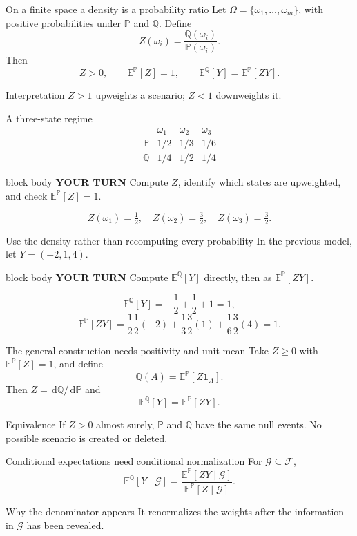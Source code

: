 \documentclass[handout,10pt,aspectratio=169]{beamer}
\newenvironment{pausebox}{\begin{beamercolorbox}[rounded=true,sep=0.8em,wd=\textwidth]{block body}
  \textbf{\color{CourseGold}YOUR TURN}\quad}{\end{beamercolorbox}}
\newcommand{\dd}{\,\mathrm d}
\newcommand{\E}{\mathbb E}
\newcommand{\Pp}{\mathbb P}
\newcommand{\Q}{\mathbb Q}
\newcommand{\cF}{\mathcal F}
\newcommand{\1}{\mathbf 1}
\begin{document}
\begin{frame}{On a finite space a density is a probability ratio}
Let \(\Omega=\{\omega_1,\ldots,\omega_m\}\), with positive probabilities
under \(\Pp\) and \(\Q\). Define
\[
Z(\omega_i)=\frac{\Q(\omega_i)}{\Pp(\omega_i)}.
\]
Then
\[
Z>0,\qquad \E^\Pp[Z]=1,\qquad
\boxed{\E^\Q[Y]=\E^\Pp[ZY].}
\]
\begin{block}{Interpretation}
\(Z>1\) upweights a scenario; \(Z<1\) downweights it.
\end{block}
\end{frame}

\begin{frame}{A three-state regime}
\[
\begin{array}{c|ccc}
 & \omega_1 & \omega_2 & \omega_3\\ \hline
\Pp & 1/2 & 1/3 & 1/6\\
\Q  & 1/4 & 1/2 & 1/4
\end{array}
\]
\begin{pausebox}
Compute \(Z\), identify which states are upweighted, and check
\(\E^\Pp[Z]=1\).
\end{pausebox}

\[
\boxed{Z(\omega_1)=\tfrac12,\quad
Z(\omega_2)=\tfrac32,\quad Z(\omega_3)=\tfrac32.}
\]
\end{frame}

\begin{frame}{Use the density rather than recomputing every probability}
In the previous model, let \(Y=(-2,1,4)\).
\begin{pausebox}
Compute \(\E^\Q[Y]\) directly, then as \(\E^\Pp[ZY]\).
\end{pausebox}

\[
\E^\Q[Y]=-\frac12+\frac12+1=1,
\]
\[
\E^\Pp[ZY]
=\frac12\frac12(-2)+\frac13\frac32(1)+\frac16\frac32(4)=1.
\]
\end{frame}

\begin{frame}{The general construction needs positivity and unit mean}
Take \(Z\ge0\) with \(\E^\Pp[Z]=1\), and define
\[
\Q(A)=\E^\Pp[Z\1_A].
\]
Then \(Z=\dd\Q/\dd\Pp\) and
\[
\boxed{\E^\Q[Y]=\E^\Pp[ZY].}
\]
\begin{alertblock}{Equivalence}
If \(Z>0\) almost surely, \(\Pp\) and \(\Q\) have the same null events.
No possible scenario is created or deleted.
\end{alertblock}
\end{frame}

\begin{frame}{Conditional expectations need conditional normalization}
For \(\mathcal G\subseteq\cF\),
\[
\boxed{
\E^\Q[Y\mid\mathcal G]
=\frac{\E^\Pp[ZY\mid\mathcal G]}
{\E^\Pp[Z\mid\mathcal G]}.}
\]
\begin{block}{Why the denominator appears}
It renormalizes the weights after the information in \(\mathcal G\) has
been revealed.
\end{block}
\end{frame}
\end{document}
